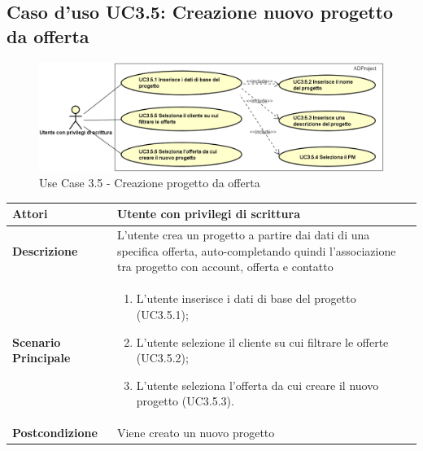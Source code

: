 	\hypertarget{UC3.5}{}
	\subsection{Caso d'uso UC3.5: Creazione nuovo progetto da offerta}
		\begin{figure}[H]
		\centering
		\includegraphics[scale=0.55]{images/useCase/UC3_5}
		\caption{Use Case 3.5 - Creazione progetto da offerta}
		\label{fig:uc3.5}
	\end{figure}
	\begin{longtable}{ | p{2.7cm} | p{12cm} |}
		\hline \textbf{Attori} & Utente con privilegi di scrittura\\ 
		\hline \textbf{Descrizione} & L'utente crea un progetto a partire dai dati di una specifica offerta, auto-completando quindi l'associazione tra progetto con account, offerta e contatto\\ 
		\hline \textbf{Scenario Principale} & \begin{enumerate}
			\itemsep-0.5em 
			\item L’utente inserisce i dati di base del progetto  (UC3.5.1);
			\item L’utente selezione il cliente su cui filtrare le offerte  (UC3.5.2);
			\item L’utente seleziona l’offerta da cui creare il nuovo progetto  (UC3.5.3).
			
		\end{enumerate}
		\\ 
		\hline \textbf{Postcondizione} & Viene creato un nuovo progetto\\ 
		\hline 
	\end{longtable}